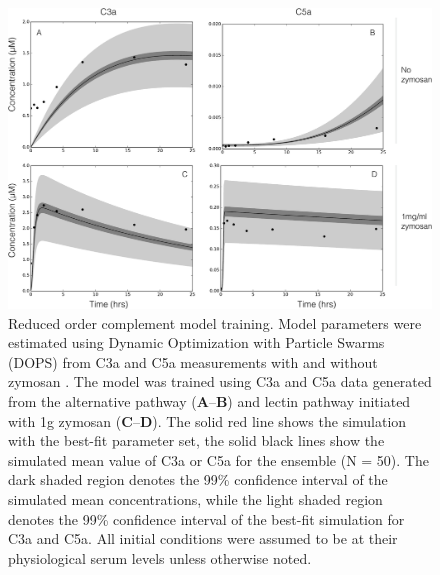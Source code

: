 \documentclass[12pt]{article}
\begin{document}
\begin{figure}[h]
\centering
\includegraphics[width=1.0\textwidth]{./figs/Figure2_Fits_final_v2.pdf}
\caption{Reduced order complement model training.
Model parameters were estimated using Dynamic Optimization with Particle Swarms (DOPS) from C3a and C5a measurements with and without zymosan \cite{morad2015time}.
The model was trained using C3a and C5a data generated from the alternative pathway (\textbf{A}--\textbf{B}) and lectin pathway initiated with 1g zymosan (\textbf{C}--\textbf{D}).
The solid red line shows the simulation with the best-fit parameter set, the solid black lines show the simulated mean value of C3a or C5a for the ensemble (N = 50).
The dark shaded region denotes the 99\% confidence interval of the simulated mean concentrations, while the light shaded region denotes the 99\%
confidence interval of the best-fit simulation for C3a and C5a. All initial conditions were assumed to be at their physiological serum levels unless otherwise noted.}\label{fig-fit}
\end{figure}
\end{document}
